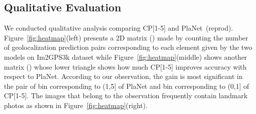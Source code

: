 \documentclass[runningheads]{llncs}
\begin{document}
\begin{appendix}
\vspace{-0.5cm}
\section{Qualitative Evaluation}
We conducted qualitative analysis comparing CP[1-5] and PlaNet~(reprod).
Figure~\ref{fig:heatmap}(left) presents a 2D matrix () made by counting the number of geolocalization prediction pairs corresponding to each element given by the two models on Im2GPS3k dataset while Figure~\ref{fig:heatmap}(middle) shows another matrix () whose lower triangle shows how much CP[1-5] improves accuracy with respect to PlaNet.
According to our observation, the gain is most significant in the pair of bin corresponding to (1,5] of PlaNet and bin corresponding to (0,1] of CP[1-5].
The images that belong to the observation frequently contain landmark photos as shown in Figure~\ref{fig:heatmap}(right).

\end{appendix}
\end{document}
